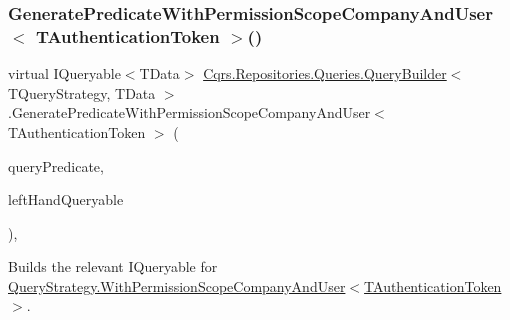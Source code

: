 \subsubsection{\texorpdfstring{Generate\+Predicate\+With\+Permission\+Scope\+Company\+And\+User$<$ T\+Authentication\+Token $>$()}{GeneratePredicateWithPermissionScopeCompanyAndUser< TAuthenticationToken >()}}
{\footnotesize\ttfamily virtual I\+Queryable$<$T\+Data$>$ \hyperlink{classCqrs_1_1Repositories_1_1Queries_1_1QueryBuilder}{Cqrs.\+Repositories.\+Queries.\+Query\+Builder}$<$ T\+Query\+Strategy, T\+Data $>$.Generate\+Predicate\+With\+Permission\+Scope\+Company\+And\+User$<$ T\+Authentication\+Token $>$ (\begin{DoxyParamCaption}\item[{\hyperlink{classCqrs_1_1Repositories_1_1Queries_1_1QueryPredicate}{Query\+Predicate}}]{query\+Predicate,  }\item[{I\+Queryable$<$ T\+Data $>$}]{left\+Hand\+Queryable }\end{DoxyParamCaption})\hspace{0.3cm}{\ttfamily [protected]}, {\ttfamily [virtual]}}



Builds the relevant I\+Queryable for \hyperlink{classCqrs_1_1Repositories_1_1Queries_1_1QueryStrategy_ac21d8e8a04e218e1a7c283ad181e0e9f_ac21d8e8a04e218e1a7c283ad181e0e9f}{Query\+Strategy.\+With\+Permission\+Scope\+Company\+And\+User$<$\+T\+Authentication\+Token$>$}. 

\mbox{\label{classCqrs_1_1Repositories_1_1Queries_1_1QueryBuilder_a027cb88563991a842002c219d7589426_a027cb88563991a842002c219d7589426}} 
